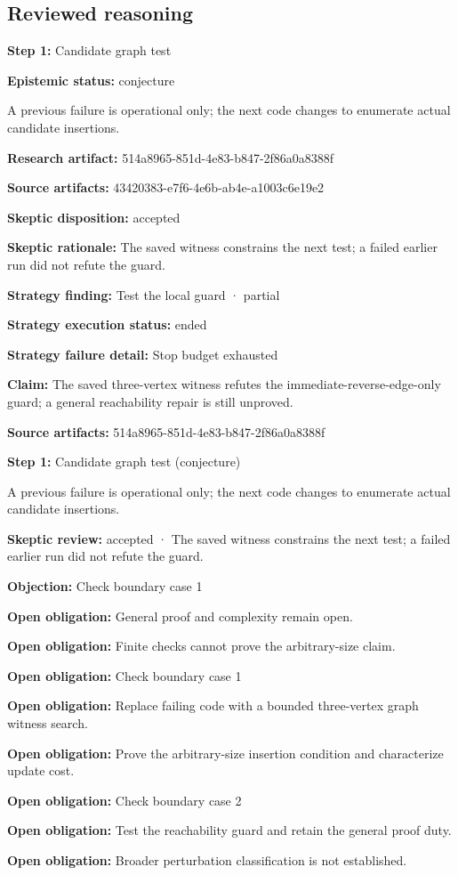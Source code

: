 \documentclass[11pt]{article}
\begin{document}
\subsection{Reviewed reasoning}
\textbf{Step 1:} Candidate graph test\par
\textbf{Epistemic status:} conjecture\par
A previous failure is operational only; the next code changes to enumerate actual candidate insertions.\par
\textbf{Research artifact:} 514a8965-851d-4e83-b847-2f86a0a8388f\par
\textbf{Source artifacts:} 43420383-e7f6-4e6b-ab4e-a1003c6e19e2\par
\textbf{Skeptic disposition:} accepted\par
\textbf{Skeptic rationale:} The saved witness constrains the next test; a failed earlier run did not refute the guard.\par
\textbf{Strategy finding:} Test the local guard · partial\par
\textbf{Strategy execution status:} ended\par
\textbf{Strategy failure detail:} Stop budget exhausted\par
\textbf{Claim:} The saved three-vertex witness refutes the immediate-reverse-edge-only guard; a general reachability repair is still unproved.\par
\textbf{Source artifacts:} 514a8965-851d-4e83-b847-2f86a0a8388f\par
\textbf{Step 1:} Candidate graph test (conjecture)\par
A previous failure is operational only; the next code changes to enumerate actual candidate insertions.\par
\textbf{Skeptic review:} accepted · The saved witness constrains the next test; a failed earlier run did not refute the guard.\par
\textbf{Objection:} Check boundary case 1\par
\textbf{Open obligation:} General proof and complexity remain open.\par
\textbf{Open obligation:} Finite checks cannot prove the arbitrary-size claim.\par
\textbf{Open obligation:} Check boundary case 1\par
\textbf{Open obligation:} Replace failing code with a bounded three-vertex graph witness search.\par
\textbf{Open obligation:} Prove the arbitrary-size insertion condition and characterize update cost.\par
\textbf{Open obligation:} Check boundary case 2\par
\textbf{Open obligation:} Test the reachability guard and retain the general proof duty.\par
\textbf{Open obligation:} Broader perturbation classification is not established.\par
\end{document}

